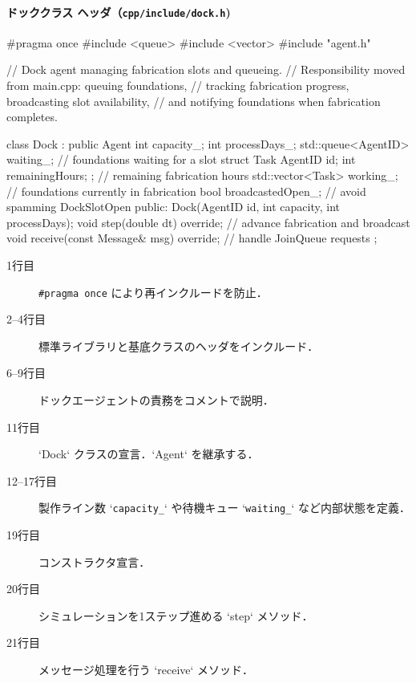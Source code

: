 \documentclass[10pt,letterpaper]{jsarticle}
\begin{document}
\paragraph{ドッククラス ヘッダ（\texttt{cpp/include/dock.h})}
\begin{cppcode}
#pragma once
#include <queue>
#include <vector>
#include "agent.h"

// Dock agent managing fabrication slots and queueing.
// Responsibility moved from main.cpp: queuing foundations,
// tracking fabrication progress, broadcasting slot availability,
// and notifying foundations when fabrication completes.

class Dock : public Agent {
    int capacity_;
    int processDays_;
    std::queue<AgentID> waiting_;           // foundations waiting for a slot
    struct Task { AgentID id; int remainingHours; }; // remaining fabrication hours
    std::vector<Task> working_;             // foundations currently in fabrication
    bool broadcastedOpen_;                  // avoid spamming DockSlotOpen
public:
    Dock(AgentID id, int capacity, int processDays);
    void step(double dt) override;          // advance fabrication and broadcast
    void receive(const Message& msg) override; // handle JoinQueue requests
};

\end{cppcode}
\begin{description}
  \item[1行目] \lstinline|#pragma once| により再インクルードを防止．
  \item[2--4行目] 標準ライブラリと基底クラスのヘッダをインクルード．
  \item[6--9行目] ドックエージェントの責務をコメントで説明．
  \item[11行目] `Dock` クラスの宣言．`Agent` を継承する．
  \item[12--17行目] 製作ライン数 `\texttt{capacity\_}` や待機キュー `\texttt{waiting\_}` など内部状態を定義．
  \item[19行目] コンストラクタ宣言．
  \item[20行目] シミュレーションを1ステップ進める `step` メソッド．
  \item[21行目] メッセージ処理を行う `receive` メソッド．
\end{description}
\end{document}

